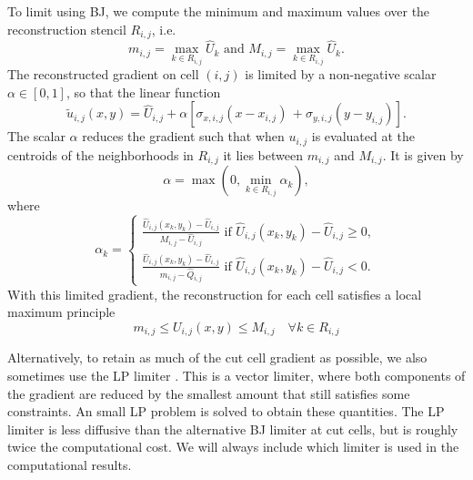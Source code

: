 To limit using BJ, we compute the minimum and maximum values over the
reconstruction stencil $R_{i,j}$, i.e.
\begin{equation}
     m_{i,j} = \max_{k \in R_{i,j}} \widehat{U}_k \text{ and } M_{i,j} = \max_{k \in R_{i,j}} \widehat{U}_k.
\label{eqn:bj}
\end{equation}
The reconstructed gradient on cell $(i,j)$ is limited by a non-negative 
scalar $\alpha \in [0,1]$, so that the linear function 
\begin{equation}
    \tilde u_{i,j}(x,y) = \widehat{U}_{i,j} + \alpha [{\sigma}_{x,i,j} ( x -  x_{i,j}) \, 
   + {\sigma}_{y,i,j}( y -  y_{i,j})].
\end{equation}
The scalar $\alpha$ reduces the gradient such that when ${u}_{i,j}$ 
is evaluated at the centroids of the neighborhoods in $R_{i,j}$ it
lies between $m_{i,j}$ and $M_{i,j}$.
It is given by
$$
\alpha = \max\left(0,\min_{k \in R_{i,j}} \alpha_k \right),
$$
where
\begin{equation}
    \alpha_k = \begin{cases}
    \frac{\widehat{U}_{i,j}( x_{k},  y_{k}) - \widehat{U}_{i,j}}{M_{i,j} - \widehat{U}_{i,j}} \text{ if } \widehat{U}_{i,j}( x_{k},  y_{k}) - \widehat{U}_{i,j} \geq 0,\\
     \frac{\widehat{U}_{i,j}( x_{k},  y_{k}) - \widehat{U}_{i,j}}{m_{i,j} - \widehat{Q}_{i,j}} \text{ if } \widehat{U}_{i,j}(x_{k}, y_{k}) - \widehat{U}_{i,j} < 0.
    \end{cases}
\end{equation}
With this limited gradient, the reconstruction for each cell satisfies a
local maximum principle
\begin{equation}
m_{i,j} \le U_{i,j}(x,y) \le M_{i,j} \quad \forall k \in R_{i,j}
\end{equation}

Alternatively, to retain as much of the cut cell gradient as possible, 
we also sometimes use the LP limiter 
\cite{May_Berger_LP}. This is a vector limiter, where both components of
the gradient are reduced by the smallest amount that still satisfies some
constraints. An small LP problem is solved to obtain these quantities.
The LP limiter is less diffusive than the alternative 
BJ limiter at cut cells, but is roughly twice the computational cost.
We will always include which limiter is used
in the computational results.  

